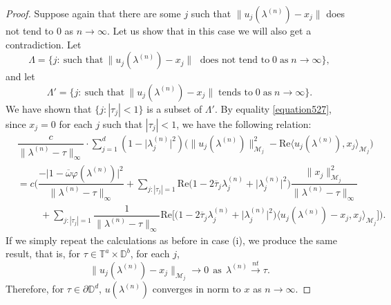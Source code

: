 \documentclass[10pt,a4paper]{amsart}
\begin{document}
\begin{proof}
 Suppose again that there are some $j$ such that 
$\|u_{j}(\lambda^{(n)}) - x_j\|$ does not tend to $0$  as $n\rightarrow \infty$. Let us show that in this case we will also get a contradiction.
Let $$\Lambda = \{ j: \ \text{such that} \ \|u_{j}(\lambda^{(n)}) - x_j\| \; \text{ does not tend to} \; 0 \; \text{as} \; n\rightarrow \infty \},$$
and let $$\Lambda'= \{ j: \ \text{such that} \ \|u_{j}(\lambda^{(n)}) - x_j\| \; \text{tends to} \; 0 \; \text{as} \; n \rightarrow \infty \}.$$
We have shown that $\{ j : |\tau_j| < 1 \}$ is a subset of $\Lambda'$. By equality \eqref{equation527},
since $x_j=0$ for each $j$ such that $|\tau_j| < 1$, we have the following relation:
\begin{align}\label{equation527notTd}
& \dfrac{c}{\|\lambda^{(n)}-\tau\|_{\infty}}\cdot\sum_{j=1}^{d}(1-\lvert \lambda^{(n)}_{j} \rvert^{2})\Big(\|u_{j}(\lambda^{(n)})\|_{\mathcal{M}_{j}}^{2}-\mathrm{Re} \langle u_{j}(\lambda^{(n)}),x_{j}\rangle_{\mathcal{M}_{j}} \Big)\nonumber\\
&=c\Bigg(\dfrac{-\lvert1-\overline{\omega}\varphi(\lambda^{(n)})\rvert^{2}}{\|\lambda^{(n)}-\tau\|_{\infty}}+\sum_{j: |\tau_j| =1}\mathrm{Re}\Big(1-2\overline{\tau}_{j}\lambda^{(n)}_{j}+\lvert\lambda^{(n)}_{j}\rvert^{2}\Big)\dfrac{\|x_{j}\|_{\mathcal{M}_{j}}^{2}}{\|\lambda^{(n)}-\tau\|_{\infty}}\nonumber\\
&\hspace{1cm}+\sum_{j: |\tau_j| =1}\dfrac{1}{\|\lambda^{(n)}-\tau\|_{\infty}}\mathrm{Re}\bigg[
\Big(1-2\overline{\tau}_{j}\lambda^{(n)}_{j}+\lvert\lambda^{(n)}_{j}\rvert^{2}\Big)\langle u_{j}(\lambda^{(n)})-x_{j},x_{j}\rangle_{\mathcal{M}_{j}}\bigg]\Bigg).
\end{align}
If we simply repeat the calculations as before in  case (i), we produce the same result, that is, for $\tau\in\mathbb{T}^{a}\times\mathbb{D}^{b}$, for each $j$,
$$\|u_{j}(\lambda^{(n)})- x_{j}\|_{\mathcal{M}_{j}}\rightarrow 0~~\text{as}~~\lambda^{(n)}{\overset{nt}\rightarrow}\tau.$$
Therefore, for $\tau\in\partial\mathbb{D}^{d}$, $u(\lambda^{(n)})$ converges in norm to $x$ as $n \rightarrow \infty$.
\end{proof}
\end{document}
